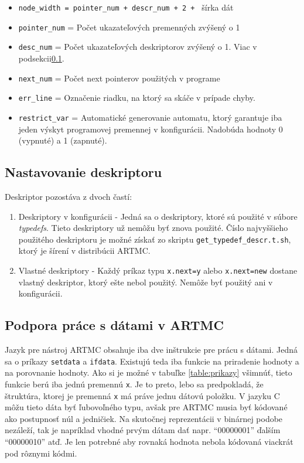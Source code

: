 \begin{itemize}
\item \texttt{node\_width = pointer\_num + descr\_num + 2 + } šírka dát  
\item \texttt{pointer\_num} = Počet ukazateľových premenných zvýšený o 1
\item \texttt{desc\_num} = Počet ukazateľových deskriptorov zvýšený o 1. Viac v podsekcii\ref{kap_descr}.
\item \texttt{next\_num} = Počet next pointerov použitých v programe
\item \texttt{err\_line} = Označenie riadku, na ktorý sa skáče v prípade chyby.
\item \texttt{restrict\_var} = Automatické generovanie automatu, ktorý garantuje iba jeden výskyt programovej premennej v konfigurácii. Nadobúda hodnoty 0 (vypnuté) a 1 (zapnuté).
\end{itemize}


\subsection{Nastavovanie deskriptoru}
\label{kap_descr}
Deskriptor pozostáva z dvoch častí:
\begin{enumerate}
\item Deskriptory v konfigurácii - Jedná sa o deskriptory, ktoré sú použité v súbore \textit{typedefs}. Tieto deskriptory už nemôžu byť znova použité. Číslo najvyššieho použitého deskriptoru je možné získať zo skriptu \texttt{get\_typedef\_descr.t.sh}, ktorý je šírení v distribúcii ARTMC.
\item Vlastné deskriptory - Každý príkaz typu \texttt{x.next=y} alebo \texttt{x.next=new} dostane vlastný deskriptor, ktorý ešte nebol použitý. Nemôže byť použitý ani v konfigurácii.
\end{enumerate}

\subsection{Podpora práce s dátami v ARTMC}
Jazyk pre nástroj ARTMC obsahuje iba dve inštrukcie pre prácu s dátami. Jedná sa o príkazy \texttt{setdata} a \texttt{ifdata}. Existujú teda iba funkcie na priradenie hodnoty a na porovnanie hodnoty. Ako si je možné v tabuľke \ref{table:prikazy} všimnúť, tieto funkcie berú iba jednú premennú \texttt{x}. Je to preto, lebo sa predpokladá, že štruktúra, ktorej je premenná \texttt{x} má práve jednu dátovú položku. V jazyku C môžu tieto dáta byť ľubovoľného typu, avšak pre ARTMC musia byť kódované ako postupnosť núl a jedničiek. Na skutočnej reprezentácii v binárnej podobe nezáleží, tak je napríklad vhodné prvým dátam dať napr. 	``00000001'' ďalším ``00000010'' atď. Je len potrebné aby rovnaká hodnota nebola kódovaná viackrát pod rôznymi kódmi.

